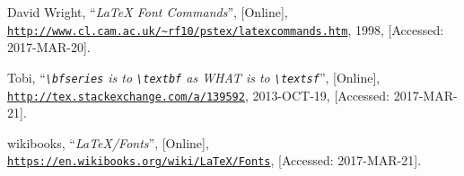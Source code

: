 \documentclass[a4paper,oneside,11pt]{article}
\newcommand\comm[1]{\texttt{\textbackslash#1}}
\begin{document}
\begin{thebibliography}{1}
        David Wright,
        ``\emph{\LaTeX{} Font Commands}'',
        [Online],
        \href{http://www.cl.cam.ac.uk/~rf10/pstex/latexcommands.htm}
             {\nolinkurl{http://www.cl.cam.ac.uk/~rf10/pstex/latexcommands.htm}},
        1998,
        [Accessed: 2017-MAR-20].

        Tobi,
        ``\emph{\comm{bfseries} is to \comm{textbf} as WHAT is to \comm{textsf}}'',
        [Online],
        \href{http://tex.stackexchange.com/a/139592}
             {\nolinkurl{http://tex.stackexchange.com/a/139592}},
        2013-OCT-19,
        [Accessed: 2017-MAR-21].

        wikibooks,
        ``\emph{\LaTeX/Fonts}'',
        [Online],
        \href{https://en.wikibooks.org/wiki/LaTeX/Fonts}
             {\nolinkurl{https://en.wikibooks.org/wiki/LaTeX/Fonts}},
        [Accessed: 2017-MAR-21].


\end{thebibliography}
\end{document}
